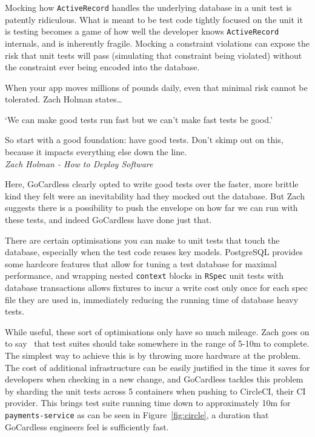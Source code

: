 \documentclass[11pt]{article}
\begin{document}
Mocking how \texttt{ActiveRecord} handles the underlying database in a unit test
is patently ridiculous. What is meant to be test code tightly focused on the
unit it is testing becomes a game of how well the developer knows
\texttt{ActiveRecord} internals, and is inherently fragile. Mocking a
constraint violations can expose the risk that unit tests will pass (simulating
that constraint being violated) without the constraint ever being encoded into
the database.

When your app moves millions of pounds daily, even that minimal risk cannot be
tolerated. Zach Holman states\dots

\begin{displayquote}

  `We can make good tests run fast but we can't make fast tests be good.'

  So start with a good foundation: have good tests. Don't skimp out on this,
  because it impacts everything else down the line. \\

  \textit{Zach Holman - How to Deploy Software~\cite{howToDeploySoftware}}

\end{displayquote}

Here, GoCardless clearly opted to write good tests over the faster, more brittle
kind they felt were an inevitability had they mocked out the database. But Zach
suggests there is a possibility to push the envelope on how far we can run
with these tests, and indeed GoCardless have done just that.

There are certain optimisations you can make to unit tests that touch the
database, especially when the test code reuses key models. PostgreSQL provides
some hardcore features that allow for tuning a test database for maximal
performance, and wrapping nested \texttt{context} blocks in \texttt{RSpec} unit
tests with database transactions allows fixtures to incur a write cost only once
for each spec file they are used in, immediately reducing the running time
of database heavy tests.

While useful, these sort of optimisations only have so much mileage. Zach goes
on to say~\cite{howToDeploySoftware} that test suites should take somewhere in
the range of 5-10m to complete. The simplest way to achieve this is by throwing
more hardware at the problem. The cost of additional infrastructure can be
easily justified in the time it saves for developers when checking in a new
change, and GoCardless tackles this problem by sharding the unit tests across 5
containers when pushing to CircleCI, their CI provider. This brings test suite
running time down to approximately 10m for \texttt{payments-service} as can be
seen in Figure~\ref{fig:circle}, a duration that GoCardless engineers feel is
sufficiently fast.
\end{document}
